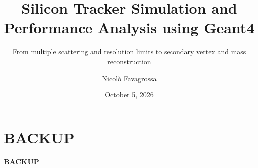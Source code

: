 \documentclass{beamer}
\date{October 5, 2026}
\title{Silicon Tracker Simulation and Performance Analysis using Geant4}
\subtitle{From multiple scattering and resolution limits to secondary vertex and mass reconstruction}
\author{\href{mailto:nicolo.favagrossa@studenti.unimi.it}{Nicolò Favagrossa}}
\begin{document}
\maketitle






\backmatter
\appendix
\section*{BACKUP}
\begin{frame}[noframenumbering]
    \begin{center}
        \Huge \textbf{BACKUP}
    \end{center}
\end{frame}
\end{document}
